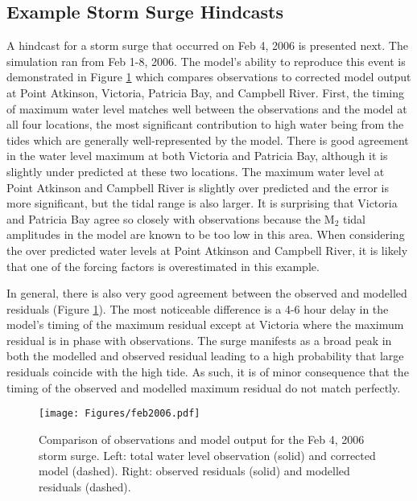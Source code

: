 \documentclass{tATO2e}
\begin{document}
\subsection{Example Storm Surge Hindcasts}\label{sec:hind}

A hindcast for a storm surge that occurred on Feb 4, 2006 is presented next. The simulation ran from Feb 1-8, 2006. The model's ability to reproduce this event is demonstrated in Figure \ref{fig:feb2006} which compares observations to corrected model output at Point Atkinson, Victoria, Patricia Bay, and Campbell River. First, the timing of maximum water level matches well between the observations and the model at all four locations, the most significant contribution to high water being from the tides which are generally well-represented by the model. There is good agreement in the water level maximum at both Victoria and Patricia Bay, although it is slightly under predicted at these two locations. The maximum water level at Point Atkinson and Campbell River is slightly over predicted and the error is more significant, but the tidal range is also larger. It is surprising that Victoria and Patricia Bay agree so closely with observations because the M$_2$ tidal amplitudes in the model are known to be too low in this area. When considering the over predicted water levels at Point Atkinson and Campbell River, it is likely that one of the forcing factors is overestimated in this example. 

In general, there is also very good agreement between the observed and modelled residuals (Figure \ref{fig:feb2006}). The most noticeable difference is a 4-6 hour delay in the model's timing of the maximum residual except at Victoria where the maximum residual is in phase with observations. The surge manifests as a broad peak in both the modelled and observed residual leading to a high probability that large residuals coincide with the high tide. As such, it is of minor consequence that the timing of the observed and modelled maximum residual do not match perfectly. 

\begin{figure}
\centering
\texttt{[image: Figures/feb2006.pdf]}
\caption{Comparison of observations and model output for the Feb 4, 2006 storm surge. Left: total water level observation (solid) and corrected model (dashed). Right: observed residuals (solid) and modelled residuals (dashed).}
\label{fig:feb2006}
\end{figure}
\end{document}
